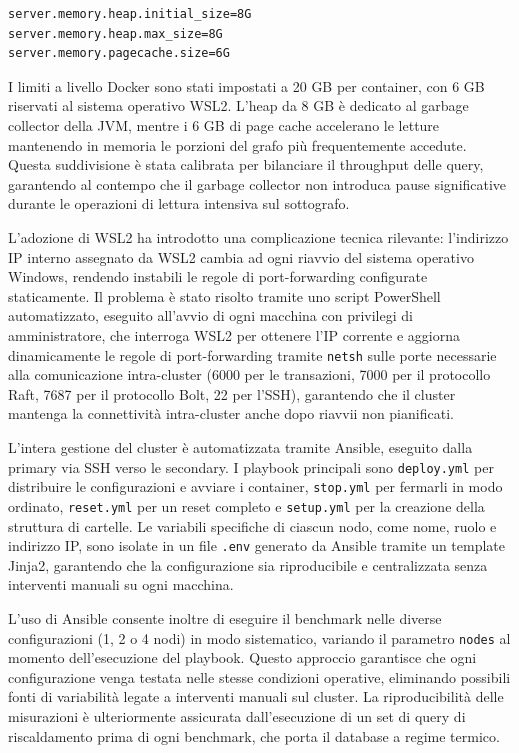 \begin{lstlisting}[caption={Configurazione memoria Neo4j (neo4j.conf)}]
server.memory.heap.initial_size=8G
server.memory.heap.max_size=8G
server.memory.pagecache.size=6G
\end{lstlisting}

I limiti a livello Docker sono stati impostati a 20 GB per container, con 6 GB riservati al sistema operativo WSL2. L'heap da 8 GB è dedicato al garbage collector della JVM, mentre i 6 GB di page cache accelerano le letture mantenendo in memoria le porzioni del grafo più frequentemente accedute. Questa suddivisione è stata calibrata per bilanciare il throughput delle query, garantendo al contempo che il garbage collector non introduca pause significative durante le operazioni di lettura intensiva sul sottografo.

L'adozione di WSL2 ha introdotto una complicazione tecnica rilevante: l'indirizzo IP interno assegnato da WSL2 cambia ad ogni riavvio del sistema operativo Windows, rendendo instabili le regole di port-forwarding configurate staticamente. Il problema è stato risolto tramite uno script PowerShell automatizzato, eseguito all'avvio di ogni macchina con privilegi di amministratore, che interroga WSL2 per ottenere l'IP corrente e aggiorna dinamicamente le regole di port-forwarding tramite \texttt{netsh} sulle porte necessarie alla comunicazione intra-cluster (6000 per le transazioni, 7000 per il protocollo Raft, 7687 per il protocollo Bolt, 22 per l'SSH), garantendo che il cluster mantenga la connettività intra-cluster anche dopo riavvii non pianificati.

L'intera gestione del cluster è automatizzata tramite Ansible, eseguito dalla primary via SSH verso le secondary. I playbook principali sono \texttt{deploy.yml} per distribuire le configurazioni e avviare i container, \texttt{stop.yml} per fermarli in modo ordinato, \texttt{reset.yml} per un reset completo e \texttt{setup.yml} per la creazione della struttura di cartelle. Le variabili specifiche di ciascun nodo, come nome, ruolo e indirizzo IP, sono isolate in un file \texttt{.env} generato da Ansible tramite un template Jinja2, garantendo che la configurazione sia riproducibile e centralizzata senza interventi manuali su ogni macchina. 

L'uso di Ansible consente inoltre di eseguire il benchmark nelle diverse configurazioni (1, 2 o 4 nodi) in modo sistematico, variando il parametro \texttt{nodes} al momento dell'esecuzione del playbook. Questo approccio garantisce che ogni configurazione venga testata nelle stesse condizioni operative, eliminando possibili fonti di variabilità legate a interventi manuali sul cluster. La riproducibilità delle misurazioni è ulteriormente assicurata dall'esecuzione di un set di query di riscaldamento prima di ogni benchmark, che porta il database a regime termico.

